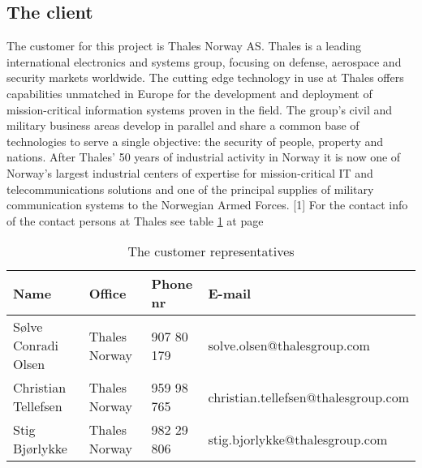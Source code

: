 \subsection{The client}
The customer for this project is Thales Norway AS. Thales is a leading international electronics and systems group, focusing on defense, aerospace and security markets worldwide. The cutting edge technology in use at Thales offers capabilities unmatched in Europe for the development and deployment of mission-critical information systems proven in the field. The group’s civil and military business areas develop in parallel and share a common base of technologies to serve a single objective: the security of people, property and nations.
\newline
\newline
After Thales’ 50 years of industrial activity in Norway it is now one of Norway’s largest industrial centers of expertise for mission-critical IT and telecommunications solutions and one of the principal supplies of military communication systems to the Norwegian Armed Forces. [1]
\newline
\newline
For the contact info of the contact persons at Thales see table \ref{tab:customer} at page \pageref{tab:customer}
\begin{table}
\begin{tabular}{l|l|l|l}
\textbf{Name} & \textbf{Office} & \textbf{Phone nr} & \textbf{E-mail} \\ \hline \hline
Sølve Conradi Olsen & Thales Norway & 907 80 179 & solve.olsen@thalesgroup.com \\ \hline
Christian Tellefsen & Thales Norway & 959 98 765 & christian.tellefsen@thalesgroup.com \\ \hline
Stig Bjørlykke & Thales Norway & 982 29 806 & stig.bjorlykke@thalesgroup.com
\end{tabular}
\caption{The customer representatives} \label{tab:customer}
\end{table}

